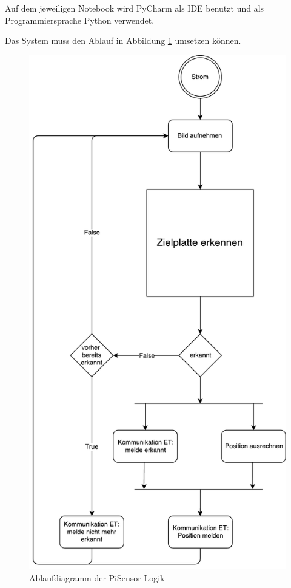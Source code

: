 \documentclass[a4paper]{report}
\begin{document}
Auf dem jeweiligen Notebook wird PyCharm als IDE benutzt und als Programmiersprache Python verwendet.

Das System muss den Ablauf in Abbildung \ref{fig:AblaufZielerkennung} umsetzen können.

\begin{figure}[h!]
	\centering
	\includegraphics[keepaspectratio,height=0.4\textheight]{Ablaufdiagramm_ModusOperandi}
	\caption{Ablaufdiagramm der PiSensor Logik}
	\label{fig:AblaufZielerkennung}
\end{figure}
\end{document}
